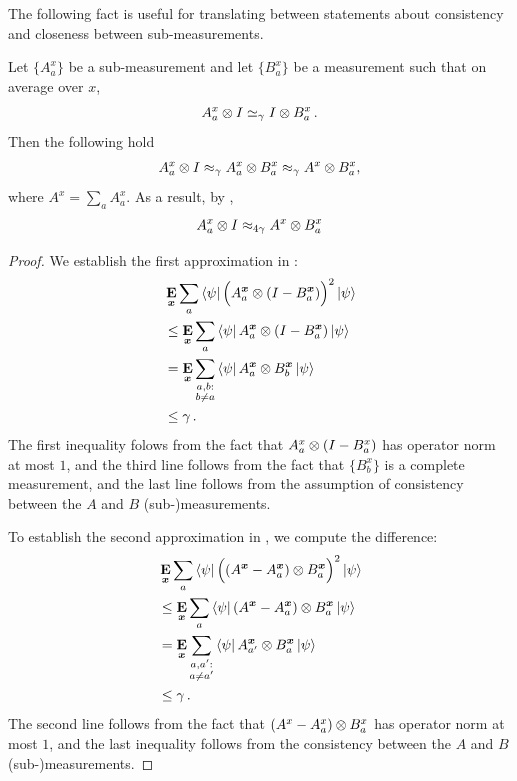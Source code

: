 The following fact is useful for translating between statements about consistency and closeness between sub-measurements.
\begin{proposition}
\label{prop:cons-sub-meas} 
Let $\{A^x_a\}$ be a sub-measurement and let $\{B^x_a\}$ be a measurement such that on average over $x$,
\[
	A^x_a \otimes I \simeq_\gamma I \otimes B^x_a \,.
\]
Then the following hold
	\begin{gather}
		A^x_a \otimes I \approx_{\gamma} A^x_a \otimes B^x_a \approx_{\gamma} A^x \otimes B^x_a,
		\label{eq:closeness5}
	\end{gather}
	where $A^x = \sum_a A^x_a$.
	As a result, by ,
	\begin{equation*}
	A^x_a \otimes I \approx_{4\gamma} A^x \otimes B^x_a
	\end{equation*}
\end{proposition}
\begin{proof}
	We establish the first approximation in :
	\begin{align*}
		&\mathop{\bf E\/}_{{\boldsymbol{x}}} \sum_a \bra{\psi} \Big (A^{{\boldsymbol{x}}}_a \otimes (I - B^{{\boldsymbol{x}}}_a) \Big)^2 \ket{\psi}  \\
		&\leq \mathop{\bf E\/}_{{\boldsymbol{x}}} \sum_a \bra{\psi} A^{{\boldsymbol{x}}}_a \otimes (I - B^{{\boldsymbol{x}}}_a) \ket{\psi} \\
		&= \mathop{\bf E\/}_{{\boldsymbol{x}}} \sum_{\substack{a,b : \\ b \neq a}} \bra{\psi} A^{{\boldsymbol{x}}}_a \otimes B^{{\boldsymbol{x}}}_b \ket{\psi} \\
		&\leq \gamma \,.
	\end{align*}
	The first inequality folows from the fact that $A^x_a \otimes (I - B^x_a)$ has operator norm at most $1$, and the third line follows from the fact that $\{B^x_b\}$ is a complete measurement, and the last line follows from the assumption of consistency between the $A$ and $B$ (sub-)measurements.
	
	To establish the second approximation in , we compute the difference:
	\begin{align*}
	&\mathop{\bf E\/}_{{\boldsymbol{x}}} \sum_a \bra{\psi} \Big ( (A^{{\boldsymbol{x}}} - A^{{\boldsymbol{x}}}_a) \otimes B^{{\boldsymbol{x}}}_a \Big)^2 \ket{\psi} \\
	&\leq  \mathop{\bf E\/}_{{\boldsymbol{x}}} \sum_a \bra{\psi} (A^{{\boldsymbol{x}}} - A^{{\boldsymbol{x}}}_a) \otimes B^{{\boldsymbol{x}}}_a  \ket{\psi} \\
	&= \mathop{\bf E\/}_{{\boldsymbol{x}}} \sum_{\substack{a,a' : \\ a \neq a'}} \bra{\psi} A^{{\boldsymbol{x}}}_{a'} \otimes B^{{\boldsymbol{x}}}_a  \ket{\psi} \\
	&\leq \gamma \,.
	\end{align*}
	The second line follows from the fact that  $(A^x - A^x_a) \otimes B^x_a$ has operator norm at most $1$, and the last inequality follows from the consistency between the $A$ and $B$ (sub-)measurements.
\end{proof}



